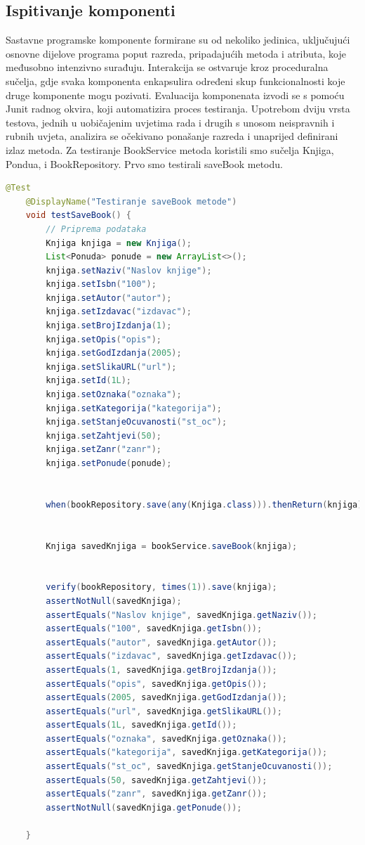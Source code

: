 			\subsection{Ispitivanje komponenti}
			     Sastavne programske komponente formirane su od nekoliko jedinica, uključujući osnovne dijelove programa poput razreda, pripadajućih metoda i atributa, koje međusobno intenzivno surađuju. Interakcija se ostvaruje kroz proceduralna sučelja, gdje svaka komponenta enkapsulira određeni skup funkcionalnosti koje druge komponente mogu pozivati. Evaluacija komponenata izvodi se s pomoću Junit radnog okvira, koji automatizira proces testiranja. Upotrebom dviju vrsta testova, jednih u uobičajenim uvjetima rada i drugih s unosom neispravnih i rubnih uvjeta, analizira se očekivano ponašanje razreda i unaprijed definirani izlaz metoda.
            Za testiranje BookService metoda koristili smo sučelja Knjiga, Pondua, i BookRepository. Prvo smo testirali saveBook metodu.
           \begin{lstlisting}[language=Java, label=lst:java_example, basicstyle=\scriptsize, baselinestretch=0.9]
 @Test
    @DisplayName("Testiranje saveBook metode")
    void testSaveBook() {
        // Priprema podataka
        Knjiga knjiga = new Knjiga();
        List<Ponuda> ponude = new ArrayList<>();
        knjiga.setNaziv("Naslov knjige");
        knjiga.setIsbn("100");
        knjiga.setAutor("autor");
        knjiga.setIzdavac("izdavac");
        knjiga.setBrojIzdanja(1);
        knjiga.setOpis("opis");
        knjiga.setGodIzdanja(2005);
        knjiga.setSlikaURL("url");
        knjiga.setId(1L);
        knjiga.setOznaka("oznaka");
        knjiga.setKategorija("kategorija");
        knjiga.setStanjeOcuvanosti("st_oc");
        knjiga.setZahtjevi(50);
        knjiga.setZanr("zanr");
        knjiga.setPonude(ponude);


        when(bookRepository.save(any(Knjiga.class))).thenReturn(knjiga);


        Knjiga savedKnjiga = bookService.saveBook(knjiga);


        verify(bookRepository, times(1)).save(knjiga);
        assertNotNull(savedKnjiga);
        assertEquals("Naslov knjige", savedKnjiga.getNaziv());
        assertEquals("100", savedKnjiga.getIsbn());
        assertEquals("autor", savedKnjiga.getAutor());
        assertEquals("izdavac", savedKnjiga.getIzdavac());
        assertEquals(1, savedKnjiga.getBrojIzdanja());
        assertEquals("opis", savedKnjiga.getOpis());
        assertEquals(2005, savedKnjiga.getGodIzdanja());
        assertEquals("url", savedKnjiga.getSlikaURL());
        assertEquals(1L, savedKnjiga.getId());
        assertEquals("oznaka", savedKnjiga.getOznaka());
        assertEquals("kategorija", savedKnjiga.getKategorija());
        assertEquals("st_oc", savedKnjiga.getStanjeOcuvanosti());
        assertEquals(50, savedKnjiga.getZahtjevi());
        assertEquals("zanr", savedKnjiga.getZanr());
        assertNotNull(savedKnjiga.getPonude());

    }
\end{lstlisting}

